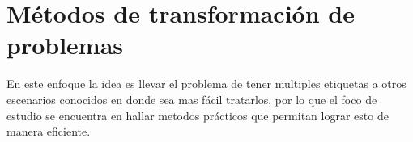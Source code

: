 \documentclass{article}
\begin{document}
        
        \section{M\'etodos de transformaci\'on de problemas}
        
        En este enfoque la idea es llevar el problema de tener multiples etiquetas a otros escenarios conocidos en donde sea mas fácil tratarlos, por lo que el foco de estudio se encuentra en hallar metodos prácticos que permitan lograr esto de manera eficiente.
        
\end{document}

